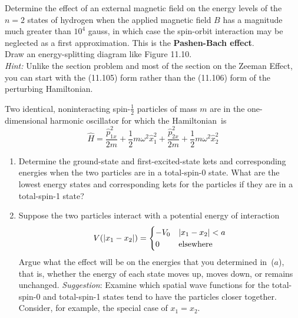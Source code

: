 \documentclass[11pt]{hmcpset}
\begin{document}



\begin{problem}

Determine the effect of an external magnetic field on the energy levels of the $n=2$ states of hydrogen when the applied magnetic field $B$ has a magnitude much greater than $10^4$ gauss, in which case the spin-orbit interaction may be neglected as a first approximation. This is the \textbf{Pashen-Bach effect}.
\\

Draw an energy-splitting diagram like Figure 11.10.
\\

\emph{Hint:} Unlike the section problem and most of the section on the Zeeman Effect, you can start with the (11.105) form rather than the (11.106) form of the perturbing Hamiltonian.


\end{problem}
\begin{solution}
	\vfill
\end{solution}
	\pagebreak
	


\begin{problem}

Two identical, noninteracting spin-$\tfrac{{1}}{{2}}$ particles of mass $ m$ are in the one-dimensional harmonic oscillator for which the Hamiltonian~is
\[
\hat{H} = {\frac{{\hat{p}_{1x}^{2}} }{{2m}}} + {\frac{{1}}{{2}}}m\omega
^{2}\hat{x}_{1}^{2} + {\frac{{\hat{p}_{2x}^{2}} }{{2m}}} +
{\frac{{1}}{{2}}}m\omega ^{2}\hat{x}_{2}^{2}
\]
\begin{enumerate}
	\item[(a)] Determine the ground-state and first-excited-state kets and corresponding
	energies when the two particles are in a total-spin-0 state. What are the
	lowest energy states and corresponding kets for the particles if they are in
	a total-spin-1 state?
	
	\item[(b)] Suppose the two particles interact with a potential energy of interaction
	\[
	V(|x_{1} - x_{2}|) = \begin{cases}
	- V_{0} & | x_{1} - x_{2} | < a \\
	0 & {\rm elsewhere} \\
	\end{cases}
	\]
	Argue what the effect will be on the energies that you determined
	in~($a$), that is, whether the energy of each state moves up,
	moves down, or remains unchanged. \textit{Suggestion}: Examine which spatial wave functions for the total-spin-0 and total-spin-1 states tend to have the particles closer together. Consider, for example, the special case of  $x_1=x_2$.
\end{enumerate}


\end{problem}
\begin{solution}
	\vfill
\end{solution}
	\pagebreak
	
\end{document}

